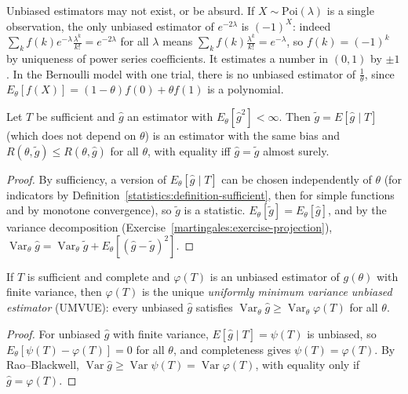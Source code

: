 \begin{counterexample}\label{statistics:counterexample-unbiased}
Unbiased estimators may not exist, or be absurd. If $X \sim \mathrm{Poi}(\lambda)$ is a single observation, the only unbiased estimator of $e^{-2\lambda}$ is $(-1)^X$: indeed $\sum_kf(k)e^{-\lambda}\frac{\lambda^k}{k!} = e^{-2\lambda}$ for all
$\lambda$ means $\sum_kf(k)\frac{\lambda^k}{k!} = e^{-\lambda}$, so $f(k) = (-1)^k$ by uniqueness of power series coefficients. It estimates a number in $(0, 1)$ by $\pm1$. In the Bernoulli model with one trial, there is no unbiased
estimator of $\frac{1}{\theta}$, since $E_\theta[f(X)] = (1 - \theta)f(0) + \theta f(1)$ is a polynomial.
\end{counterexample}

\begin{theorem}\label{statistics:theorem-rao-blackwell}
Let $T$ be sufficient and $\hat g$ an estimator with $E_\theta[\hat g^2] < \infty$. Then $\tilde g = E[\hat g \mid T]$ (which does not depend on $\theta$) is an estimator with the same bias and
$R(\theta, \tilde g) \leq R(\theta, \hat g)$ for all $\theta$, with equality iff $\hat g = \tilde g$ almost surely.
\end{theorem}

\begin{proof}
By sufficiency, a version of $E_\theta[\hat g \mid T]$ can be chosen independently of $\theta$ (for indicators by Definition~\ref{statistics:definition-sufficient}, then for simple functions and by monotone convergence), so $\tilde g$ is
a statistic. $E_\theta[\tilde g] = E_\theta[\hat g]$, and by the variance decomposition (Exercise~\ref{martingales:exercise-projection}),
$\operatorname{Var}_\theta\hat g = \operatorname{Var}_\theta\tilde g + E_\theta[(\hat g - \tilde g)^2]$.
\end{proof}

\begin{theorem}\label{statistics:theorem-lehmann-scheffe}
If $T$ is sufficient and complete and $\varphi(T)$ is an unbiased estimator of $g(\theta)$ with finite variance, then $\varphi(T)$ is the unique \emph{uniformly minimum variance unbiased estimator} (UMVUE): every unbiased
$\hat g$ satisfies $\operatorname{Var}_\theta\hat g \geq \operatorname{Var}_\theta\varphi(T)$ for all $\theta$.
\end{theorem}

\begin{proof}
For unbiased $\hat g$ with finite variance, $E[\hat g \mid T] = \psi(T)$ is unbiased, so $E_\theta[\psi(T) - \varphi(T)] = 0$ for all $\theta$, and completeness gives $\psi(T) = \varphi(T)$. By Rao--Blackwell,
$\operatorname{Var}\hat g \geq \operatorname{Var}\psi(T) = \operatorname{Var}\varphi(T)$, with equality only if $\hat g = \varphi(T)$.
\end{proof}

